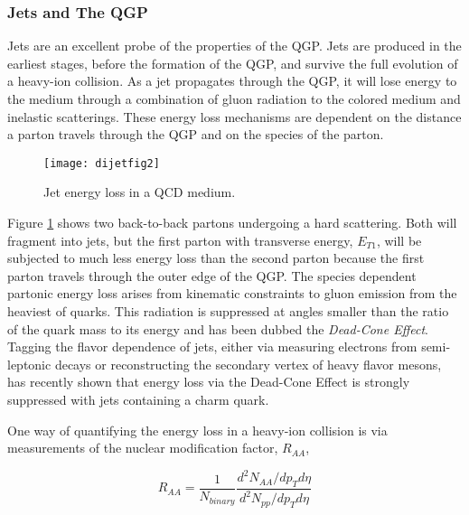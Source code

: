 
\subsubsection{Jets and The QGP}

Jets are an excellent probe of the properties of the QGP.  Jets are produced in the earliest stages, before the formation of the QGP, and survive the full evolution of a heavy-ion collision.  As a jet propagates through the QGP, it will lose energy to the medium through a combination of gluon radiation to the colored medium and inelastic scatterings.  These energy loss mechanisms are dependent on the distance a parton travels through the QGP and on the species of the parton.  


\begin{figure}[h]
\texttt{[image: dijetfig2]}
\centering
\caption{Jet energy loss in a QCD medium\cite{Mohanty:2013yca}.}
\label{fig:JetEloss}
\end{figure}

Figure \ref{fig:JetEloss} shows two back-to-back partons undergoing a hard scattering.  Both will fragment into jets, but the first parton with transverse energy, $E_{T1}$, will be subjected to much less energy loss than the second parton because the first parton travels through the outer edge of the QGP.  The species dependent partonic energy loss arises from kinematic constraints to gluon emission from the heaviest of quarks.  This radiation is suppressed at angles smaller than the ratio of the quark mass to its energy and has been dubbed the \textit{Dead-Cone Effect}\cite{Thomas:2004ie}.  Tagging the flavor dependence of jets, either via measuring electrons from semi-leptonic decays or reconstructing the secondary vertex of heavy flavor mesons, has recently shown that energy loss via the Dead-Cone Effect is strongly suppressed with jets containing a charm quark\cite{CAO2018255}.

One way of quantifying the energy loss in a heavy-ion collision is via measurements of the nuclear modification factor, $R_{AA}$,


\begin{equation}
R_{AA} = \frac{1}{N_{binary}} \frac{d^{2}N_{AA}/dp_{T}d\eta}{d^{2}N_{pp}/dp_{T}d\eta}
\label{eq:RAA}
\end{equation}

